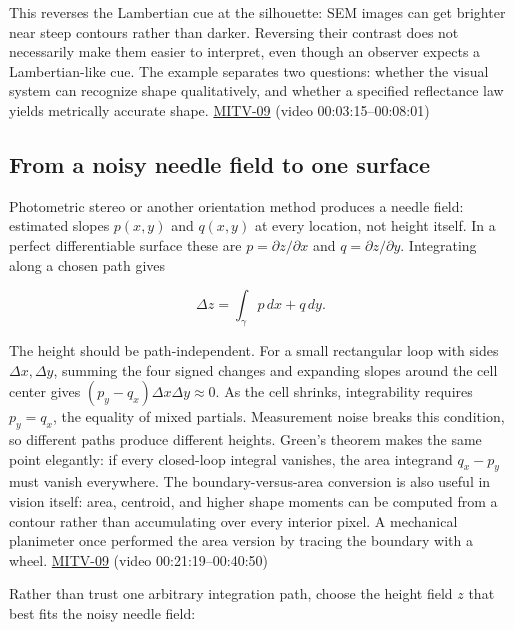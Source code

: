 This reverses the Lambertian cue at the silhouette: SEM images can get brighter near steep contours rather than darker. Reversing their contrast does not necessarily make them easier to interpret, even though an observer expects a Lambertian-like cue. The example separates two questions: whether the visual system can recognize shape qualitatively, and whether a specified reflectance law yields metrically accurate shape. \hyperref[04-visual-computing-ii-ch036-mitv-09---shape-from-shading-general-case---from-first-order-nonlinear-pde-to-five-odes]{MITV-09} (video 00:03:15--00:08:01)

\subsection{From a noisy needle field to one surface}\label{04-visual-computing-ii-ch032-from-a-noisy-needle-field-to-one-surface}

\hypertarget{04-visual-computing-ii-ch032-from-a-noisy-needle-field-to-one-surface}{}

Photometric stereo or another orientation method produces a needle field: estimated slopes \(p(x,y)\) and \(q(x,y)\) at every location, not height itself. In a perfect differentiable surface these are \(p=\partial z/\partial x\) and \(q=\partial z/\partial y\). Integrating along a chosen path gives

\[
\Delta z=\int_\gamma p\,dx+q\,dy.
\]

The height should be path-independent. For a small rectangular loop with sides \(\Delta x,\Delta y\), summing the four signed changes and expanding slopes around the cell center gives \((p_y-q_x)\Delta x\Delta y\approx0\). As the cell shrinks, integrability requires \(p_y=q_x\), the equality of mixed partials. Measurement noise breaks this condition, so different paths produce different heights. Green's theorem makes the same point elegantly: if every closed-loop integral vanishes, the area integrand \(q_x-p_y\) must vanish everywhere. The boundary-versus-area conversion is also useful in vision itself: area, centroid, and higher shape moments can be computed from a contour rather than accumulating over every interior pixel. A mechanical planimeter once performed the area version by tracing the boundary with a wheel. \hyperref[04-visual-computing-ii-ch036-mitv-09---shape-from-shading-general-case---from-first-order-nonlinear-pde-to-five-odes]{MITV-09} (video 00:21:19--00:40:50)

Rather than trust one arbitrary integration path, choose the height field \(z\) that best fits the noisy needle field:

